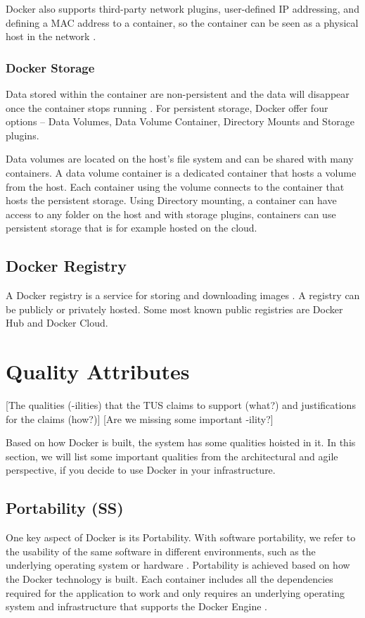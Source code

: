 \documentclass[fleqn,12pt]{olplainarticle}
\begin{document}
Docker also supports third-party network plugins, user-defined IP addressing, and defining a MAC address to a container, so the container can be seen as a physical host in the network \citep{docker:network}.

\subsubsection{Docker Storage}

Data stored within the container are non-persistent and the data will disappear once the container stops running \citep{aquasec:docker_architecture}. For persistent storage, Docker offer four options – Data Volumes, Data Volume Container, Directory Mounts and Storage plugins. 

Data volumes are located on the host's file system and can be shared with many containers. A data volume container is a dedicated container that hosts a volume from the host. Each container using the volume connects to the container that hosts the persistent storage. Using Directory mounting, a container can have access to any folder on the host and with storage plugins, containers can use persistent storage that is for example hosted on the cloud.

\subsection{Docker Registry}

A Docker registry is a service for storing and downloading images \citep{aquasec:docker_architecture}. A registry can be publicly or privately hosted. Some most known public registries are Docker Hub and Docker Cloud.

\section{Quality Attributes}

[The qualities (-ilities) that the TUS claims to support (what?) and justifications for the claims (how?)]
[Are we missing some important -ility?]

Based on how Docker is built, the system has some qualities hoisted in it. In this section, we will list some important qualities from the architectural and agile perspective, if you decide to use Docker in your infrastructure. 

\subsection{Portability (SS)}
One key aspect of Docker is its Portability. With software portability, we refer to the usability of the same software in different environments, such as the underlying operating system or hardware \citep{wiki:Software_portability}. Portability is achieved based on how the Docker technology is built. Each container includes all the dependencies required for the application to work and only requires an underlying operating system and infrastructure that supports the Docker Engine \citep{hy:DevOps_with_Docker}.
\end{document}
